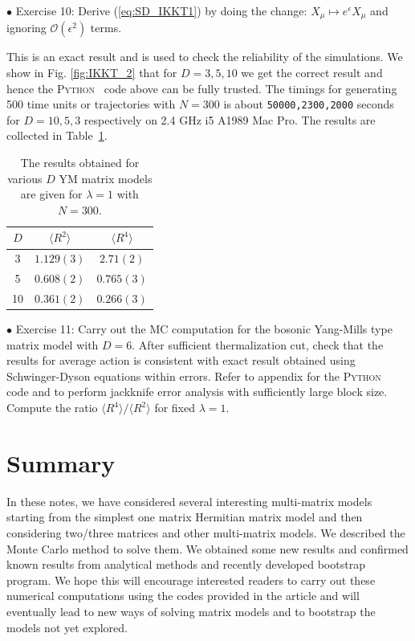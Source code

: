 \documentclass[11pt]{article}
\newcommand{\PY}{\textsc{Python}}
\begin{document}
\begin{mdframed}[backgroundcolor=blue!3] 
	\textsc{} 
	$\bullet$ Exercise 10: Derive (\ref{eq:SD_IKKT1}) by doing the change: $X_{\mu} \mapsto e^{\epsilon}X_{\mu}$ and ignoring 
	$\mathcal{O}(\epsilon^{2})$ terms.
\end{mdframed}

This is an exact result and is used to check the reliability of the simulations. 
We show in Fig. \ref{fig:IKKT_2} that for $D=3,5,10$ we get the correct result and 
hence the \PY~ code above can be fully trusted. The timings for generating 500 time units or trajectories 
with $N=300$ is about \texttt{50000,2300,2000} seconds for $D = 10, 5, 3$ respectively on 2.4 GHz i5 A1989 Mac Pro. 
The results are collected in Table~\ref{table:D_IKKT_data}. 
\begin{table}[h!]
	\centering
	\begin{tabular}{||c c c||} 
		\hline
		$D$ & $ \langle R^2 \rangle$ & $ \langle R^4 \rangle$ \\ [0.5ex] 
		\hline\hline
		3 & $1.129(3) $ & $2.71(2) $  \\ 
		5 & $0.608(2) $ & $0.765(3) $  \\
		10 & $0.361(2)$ & $0.266(3)$
		 \\ [1ex] 
		\hline 
	\end{tabular}
\caption{The results obtained for various $D$ YM matrix models are given for $\lambda=1$ with $N=300$.}
\label{table:D_IKKT_data}
\end{table}

\begin{mdframed}[backgroundcolor=blue!3] 
	\textsc{} 
	$\bullet$ Exercise 11: Carry out the MC computation for the bosonic Yang-Mills type matrix model with $D=6$. After sufficient thermalization cut, check that the results for average action is consistent with exact result obtained using Schwinger-Dyson equations within errors. Refer to appendix for the \PY~ code and to perform jackknife error analysis with sufficiently large block size. Compute the ratio $\langle R^4 \rangle / \langle R^2 \rangle$ for fixed $\lambda=1$. 
\end{mdframed} 


\section{Summary}
In these notes, we have considered several interesting multi-matrix models starting
from the simplest one matrix Hermitian matrix model and then considering two/three 
matrices and other multi-matrix models. We described the Monte Carlo method 
to solve them. We obtained some new results and confirmed known 
results from analytical methods and recently developed 
bootstrap program. We hope this will encourage interested readers 
to carry out these numerical computations using the codes provided in the article 
and will eventually lead to new ways of solving matrix models and 
to bootstrap the models not yet explored. 
\end{document}
